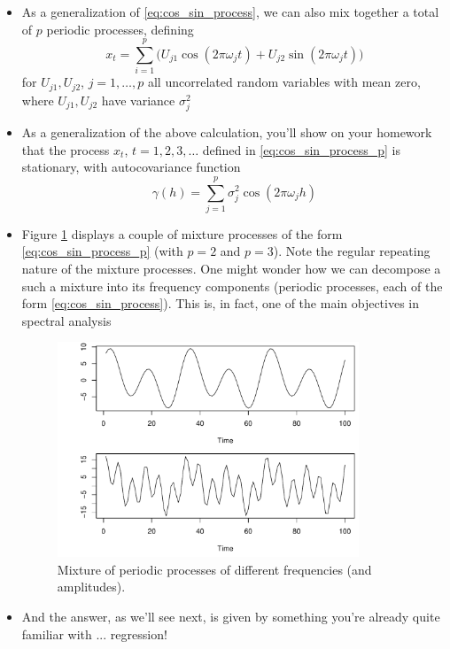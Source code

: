 \documentclass{article}
\begin{document}
\begin{itemize}
\item As a generalization of \eqref{eq:cos_sin_process}, we can also mix
  together a total of $p$ periodic processes, defining
  \begin{equation}
  \label{eq:cos_sin_process_p}
  x_t = \sum_{i=1}^p \Big( U_{j1} \cos(2\pi\omega_j t) + U_{j2}
  \sin(2\pi\omega_j t) \Big) 
  \end{equation}
  for $U_{j1}, U_{j2}$, $j = 1,\dots,p$ all uncorrelated random variables with
  mean zero, where $U_{j1}, U_{j2}$ have variance $\sigma^2_j$

\item As a generalization of the above calculation, you'll show on your homework
  that the process $x_t$, $t = 1,2,3,\dots$ defined in
  \eqref{eq:cos_sin_process_p} is stationary, with autocovariance function  
  \[
  \gamma(h) = \sum_{j=1}^p \sigma^2_j \cos(2\pi\omega_j h)
  \]

\item Figure \ref{fig:cos_mixture} displays a couple of mixture processes of the 
  form \eqref{eq:cos_sin_process_p} (with $p=2$ and $p=3$). Note the regular
  repeating nature of the mixture processes. One might wonder how we can
  decompose a such a mixture into its frequency components (periodic processes,
  each of the form \eqref{eq:cos_sin_process}). This is, in fact, one of the
  main objectives in spectral analysis

\begin{figure}[htb]
\centering
\includegraphics[width=0.85\textwidth]{fig/cos-mixture-1.pdf}
\caption{Mixture of periodic processes of different frequencies (and
  amplitudes).}  
\label{fig:cos_mixture}
\end{figure}

\item And the answer, as we'll see next, is given by something you're already
  quite familiar with ... regression! 
\end{itemize}
\end{document}
